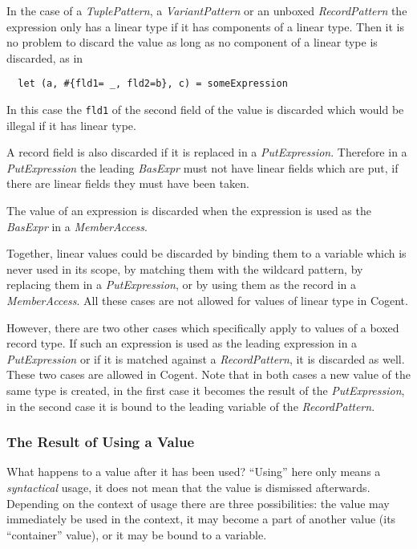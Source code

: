 \documentclass[a4paper]{report}
\newcommand{\code}[1]{\textnormal{\texttt{#1}}}
\newcommand{\cogent}{Cogent\xspace}
\begin{document}
In the case of a 
\textit{TuplePattern}, a \textit{VariantPattern} or an unboxed \textit{RecordPattern} the expression only has a linear
type if it has components of a linear type. Then it is no problem to discard the value as long as no component of a 
linear type is discarded, as in 
\cbstart
\begin{verbatim}
  let (a, #{fld1= _, fld2=b}, c) = someExpression
\end{verbatim}
\cbend
In this case the \code{fld1} of the second field of the value is discarded which would be illegal if it has linear type.
\cbdelete

A record field is also discarded if it is replaced in a \textit{PutExpression}. Therefore in a \textit{PutExpression}
the leading \textit{BasExpr} must not have linear fields which are put, if there are linear fields they must have been taken.

The value of an expression is discarded when the expression is used as the \textit{BasExpr} in a \textit{MemberAccess}.

Together, linear values could be discarded by binding them to a variable which is never used in its scope, by matching them 
with the wildcard pattern, by replacing them in a \textit{PutExpression}, or by using them as the record in a \textit{MemberAccess}.
All these cases are not allowed for values of linear type in \cogent.

However, there are two other cases which specifically apply to values of a boxed record type. If such an expression is used 
as the leading expression in a \textit{PutExpression} or if it is matched against a \textit{RecordPattern}, it is discarded
as well. These two cases are allowed in \cogent. Note that in both cases a new value of the same type is created, in the
first case it becomes the result of the \textit{PutExpression}, in the second case it is bound to the leading variable of the
\textit{RecordPattern}.

\subsubsection{The Result of Using a Value}

What happens to a value after it has been used? ``Using'' here only means a \textit{syntactical} usage, it does not mean
that the value is dismissed afterwards. Depending on the context of usage there are three possibilities: the value may immediately
be used in the context, it may become a part of another value (its ``container'' value), or it may be bound to a variable.
\end{document}
